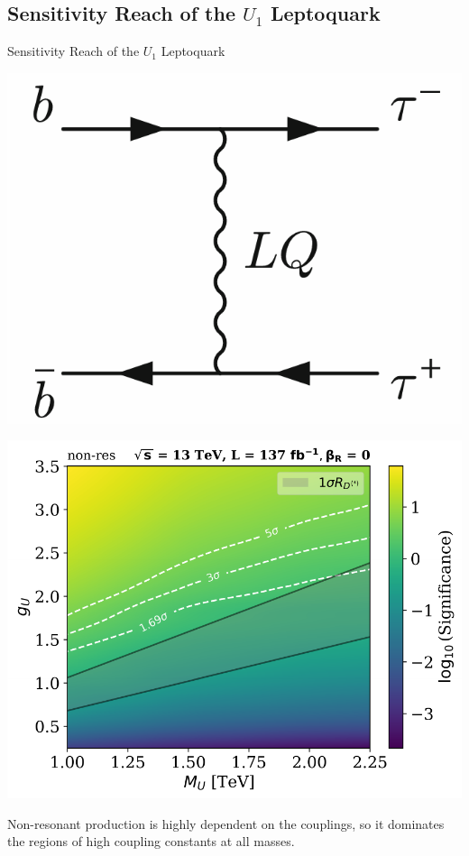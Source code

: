 \documentclass{../bredelebeamer}
\begin{document}
\subsection{Sensitivity Reach of the $U_1$ Leptoquark}
\begin{frame}{Sensitivity Reach of the $U_1$ Leptoquark}
	\begin{minipage}{.32\linewidth}
		\includegraphics[width=\linewidth]{../2023_paper/non_resonant.png}

	\end{minipage}
	\begin{minipage}{.66\linewidth}
		\includegraphics[width=\linewidth]{../2023_paper/Significance_Heatmap_13TeV_L137_non-res_combined_woRHC.pdf}


	\end{minipage}

	{\large

		  Non-resonant production is highly dependent on the couplings, so it dominates the regions of high coupling constants at all masses.
	}
\end{frame}
\end{document}
